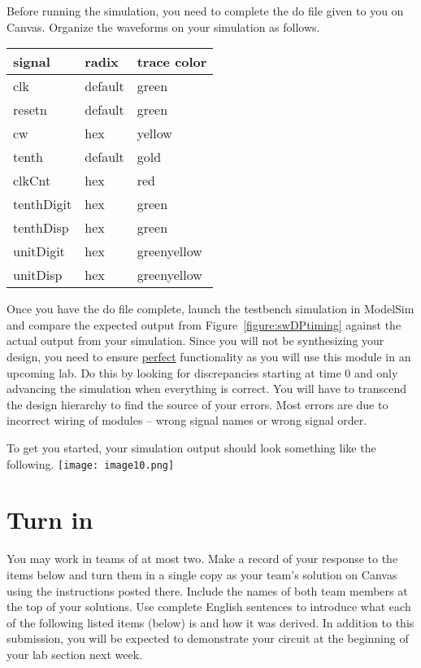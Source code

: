 \hypertarget{link:swDpSim}{}{{}
    Before running the simulation, you need to complete the
    do file given to you on Canvas.  Organize the waveforms
    on your simulation as follows.

    \begin{tabular}{p{3cm}p{3cm}p{3cm}}
        signal & radix & trace color \\ \hline
        clk         & default     & green  \\
        resetn         & default     & green  \\
        cw         & hex         & yellow  \\
        tenth         & default     & gold  \\
        clkCnt         & hex         & red  \\
        tenthDigit     & hex         & green  \\
        tenthDisp     & hex         & green  \\
        unitDigit     & hex         & greenyellow  \\
        unitDisp     & hex         & greenyellow  \\
    \end{tabular}

    Once you have the do file complete, launch the testbench
    simulation in ModelSim and compare the expected output
    from Figure~\ref{figure:swDPtiming} against the actual
    output from your simulation.  Since you will not be synthesizing
    your design, you need to ensure \underline{perfect} functionality
    as you will use this module in an upcoming lab.  Do this by
    looking for discrepancies starting at time 0 and only advancing
    the simulation when everything is correct. You will
    have to transcend the design hierarchy to find the source of your
    errors. Most errors are due to incorrect wiring of modules --
    wrong signal names or wrong signal order.

    To get you started, your simulation output should look something like
    the following.
    \texttt{[image:  image10.png]}

    \section{Turn in}

    You may work in teams of at most two. Make a record of your response to
    the items below and turn them in a single copy as your team's solution
    on Canvas using the instructions posted there. Include the names of both
    team members at the top of your solutions. Use complete English
    sentences to introduce what each of the following listed items (below)
    is and how it was derived. In addition to this submission, you will be
    expected to demonstrate your circuit at the beginning of your lab
    section next week.

}
